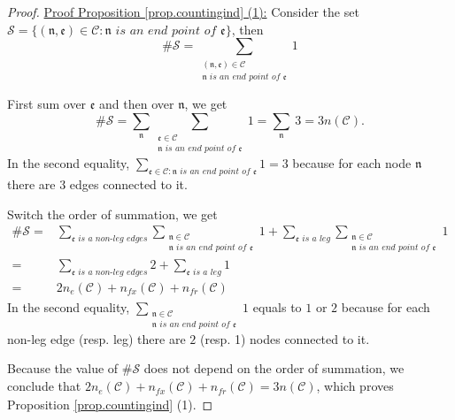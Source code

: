 \begin{proof}
\underline{Proof Proposition \ref{prop.countingind} (1):} Consider the set $\mathcal{S}=\{(\mathfrak{n}, \mathfrak{e})\in \mathcal{C}: \mathfrak{n} \textit{ is an end point of }\mathfrak{e}\}$, then 
\begin{equation}
\#\mathcal{S}=\sum_{\substack{(\mathfrak{n}, \mathfrak{e})\in \mathcal{C}\\ \mathfrak{n} \textit{ is an end point of }\mathfrak{e}}} 1
\end{equation}

First sum over $\mathfrak{e}$ and then over $\mathfrak{n}$, we get 
\begin{equation}
\#\mathcal{S}=\sum_{\mathfrak{n}}\sum_{\substack{\mathfrak{e}\in \mathcal{C}\\ \mathfrak{n} \textit{ is an end point of }\mathfrak{e}}} 1=\sum_{\mathfrak{n}}\ 3=3n(\mathcal{C}).
\end{equation}
In the second equality, $\sum_{\mathfrak{e}\in \mathcal{C}: \mathfrak{n} \textit{ is an end point of }\mathfrak{e}} 1 =3$ because for each node $\mathfrak{n}$ there are $3$ edges connected to it.

Switch the order of summation, we get 
\begin{equation}
\begin{split}
\#\mathcal{S}=&\sum_{\mathfrak{e} \textit{ is a non-leg edges}}\sum_{\substack{\mathfrak{n}\in \mathcal{C}\\ \mathfrak{n} \textit{ is an end point of }\mathfrak{e}}} 1+\sum_{\mathfrak{e} \textit{ is a leg}}\sum_{\substack{\mathfrak{n}\in \mathcal{C}\\ \mathfrak{n} \textit{ is an end point of }\mathfrak{e}}} 1
\\
=&\sum_{\mathfrak{e} \textit{ is a non-leg edges}} 2+\sum_{\mathfrak{e} \textit{ is a leg}} 1
\\
=& 2n_e(\mathcal{C})+n_{fx}(\mathcal{C})+n_{\textit{fr}}(\mathcal{C})
\end{split}
\end{equation}
In the second equality, $\sum_{\substack{\mathfrak{n}\in \mathcal{C}\\ \mathfrak{n} \textit{ is an end point of }\mathfrak{e}}} 1$ equals to $1$ or $2$ because for each non-leg edge (resp. leg) there are $2$ (resp. 1) nodes connected to it.

Because the value of $\#\mathcal{S}$ does not depend on the order of summation, we conclude that $2n_e(\mathcal{C})+n_{fx}(\mathcal{C})+n_{\textit{fr}}(\mathcal{C})=3n(\mathcal{C})$, which proves Proposition \ref{prop.countingind} (1).



\end{proof}
